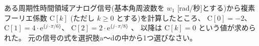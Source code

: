 ある周期性時間領域アナログ信号(基本角周波数を $w_1$ [rad/秒]とする)から複素フーリエ係数 $\textrm{C}[k]$ (ただし $k \geq 0$ とする)を計算したところ、
$\textrm{C}[0] = -2$、
$\textrm{C}[1] = 4 \cdot \textrm{e}^{\{ j \cdot \pi/6 \}}$、
$\textrm{C}[2] = 2 \cdot \textrm{e}^{\{ j \cdot \pi/8 \}}$ 、
以降は $\textrm{C}[k] = 0$ という値が求められた。
元の信号の式を選択肢a〜dの中から1つ選びなさい。
